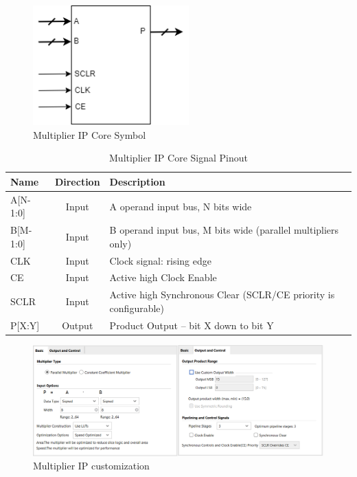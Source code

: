 \documentclass[a4paper, 12pt]{report}
\begin{document}
\begin{figure}[H]
    \centering
    \includegraphics[width = 6cm]{picture/IP Catalog/mul/Core_symbol_mul.png}
    \caption{Multiplier IP Core Symbol}
    \medskip
\end{figure}

\begin{table}[H]
    \centering
    \begin{tabular}{|l|c|l|}
        \hline
            \textbf{Name} & \textbf{Direction} & \textbf{Description}  \\
        \hline
        \hline
            A[N-1:0] & Input & A operand input bus, N bits wide \\
        \hline
            B[M-1:0] & Input & B operand input bus, M bits wide (parallel multipliers only) \\
        \hline
            CLK & Input & Clock signal: rising edge \\
        \hline
            CE & Input & Active high Clock Enable \\
        \hline     
            SCLR & Input & Active high Synchronous Clear (SCLR/CE priority is configurable) \\
        \hline
            P[X:Y] & Output & Product Output – bit X down to bit Y \\
        \hline
    \end{tabular}
    \caption{Multiplier IP Core Signal Pinout}
\end{table}

\begin{figure}[H]
    \centering
    \includegraphics[width = 14cm]{picture/IP Catalog/mul/ipmulcustom1.png}
    \caption{Multiplier IP customization}
    \medskip
\end{figure}
\end{document}
